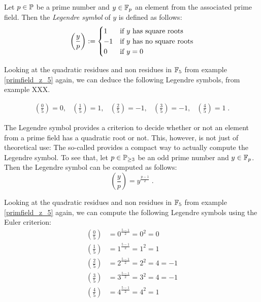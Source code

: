 Let $ p \in \mathbb{P} $ be a prime number and $ y \in \mathbb{F}_p $ an element from the associated prime field. Then the \textit{Legendre symbol} of $ y $ is defined as follows:
\begin{equation}
\label{eq: Legendre-symbol}
\left (\frac{y}{p} \right): =
\begin{cases}
1 & \text{if $ y $ has square roots} \\
-1 & \text{if $ y $ has no square roots} \\
0 & \text{if $ y = 0 $}
\end{cases}
\end{equation}
\begin{example}
Looking at the quadratic residues and non residues in $\mathbb{F}_5$ from example \ref{primfield_z_5} again, we can deduce the following Legendre symbols, from example XXX.

$$
\begin{array}{ccccc}
\left (\frac{0}{5} \right) = 0, &
\left (\frac{1}{5} \right) = 1, &
\left (\frac{2}{5} \right) = -1, &
\left (\frac{3}{5} \right) = -1, &
\left (\frac{4}{5} \right) = 1 \;.
\end{array}
$$
\end{example}
The Legendre symbol provides a criterion to decide whether or not an element from a prime field has a quadratic root or not. This, however, is not just of theoretical use: The  so-called  provides a compact way to actually compute the Legendre symbol. To see that, let $ p \in \mathbb{P}_{\geq 3} $ be an odd prime number and $ y \in \mathbb{F}_p $. Then the Legendre symbol can be computed as follows:
\begin{equation}
\label{eq: Euler_criterion}
\left (\frac{y}{p} \right) = y^{\frac{p-1}{2}} \;.
\end{equation}
\begin{example}
Looking at the quadratic residues and non residues in $\mathbb{F}_5$ from example \ref{primfield_z_5} again, we can compute the following Legendre symbols using the Euler criterion:
\begin{align*}
\left (\frac{0}{5} \right) &= 0^{\frac{5-1}{2}}= 0^2=0\\
\left (\frac{1}{5} \right) &= 1^{\frac{5-1}{2}}= 1^2=1\\
\left (\frac{2}{5} \right) &= 2^{\frac{5-1}{2}}= 2^2=4 = -1\\
\left (\frac{3}{5} \right) &= 3^{\frac{5-1}{2}}= 3^2=4 =-1\\
\left (\frac{4}{5} \right) &= 4^{\frac{5-1}{2}}= 4^2=1
\end{align*}
\end{example}\label{prime-field-F13}
